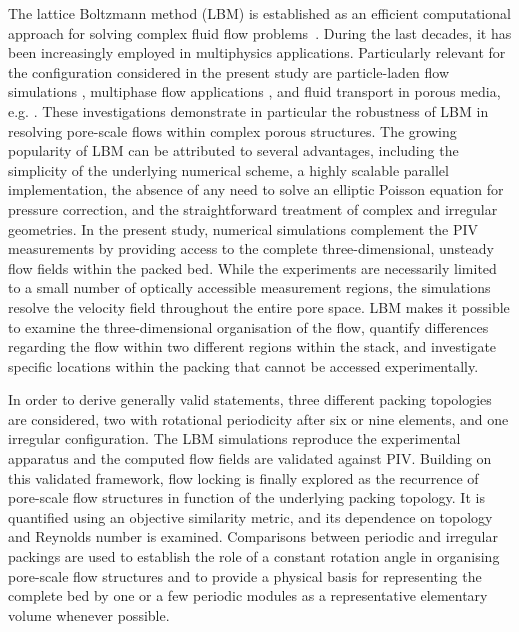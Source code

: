 The lattice Boltzmann method (LBM) is established as an efficient computational approach for solving complex fluid flow problems~\cite{kruger2017lattice,Sullivan}. During the last decades, it has been increasingly employed in multiphysics applications. Particularly relevant for the configuration considered in the present study are particle-laden flow simulations \cite{KRAUSE2017,Khalili2017, RETTINGER2018, GHARIBI2024,Gharibi2025}, multiphase flow applications \cite{Mazloomi2015,Liu2016,gharibi2020,fei2020,GHARIBI2024-2, wu2025}, and fluid transport in porous media, e.g. \cite{PAN2006, GHARIBI2020-2,STOCKINGER2024,Fei2023, ZHOU2026}. These investigations demonstrate in particular the robustness of LBM in resolving pore-scale flows within complex porous structures. The growing popularity of LBM can be attributed to several advantages, including the simplicity of the underlying numerical scheme, a highly scalable parallel implementation, the absence of any need to solve an elliptic Poisson equation for pressure correction, and the straightforward treatment of complex and irregular geometries. In the present study, numerical simulations complement the PIV measurements by providing access to the complete three-dimensional, unsteady flow fields within the packed bed. While the experiments are necessarily limited to a small number of optically accessible measurement regions, the simulations resolve the velocity field throughout the entire pore space. LBM makes it possible to examine the three-dimensional organisation of the flow, quantify differences regarding the flow within two different regions within the stack, and investigate specific locations within the packing that cannot be accessed experimentally.

In order to derive generally valid statements, three different packing topologies are considered, two with rotational periodicity after six or nine elements, and one irregular configuration. The LBM simulations reproduce the experimental apparatus and the computed flow fields are validated against PIV. Building on this validated framework, flow locking is finally explored as the recurrence of pore-scale flow structures in function of the underlying packing topology. It is quantified using an objective similarity metric, and its dependence on topology and Reynolds number is examined. Comparisons between periodic and irregular packings are used to establish the role of a constant rotation angle in organising pore-scale flow structures and to provide a physical basis for representing the complete bed by one or a few periodic modules as a representative elementary volume whenever possible.

